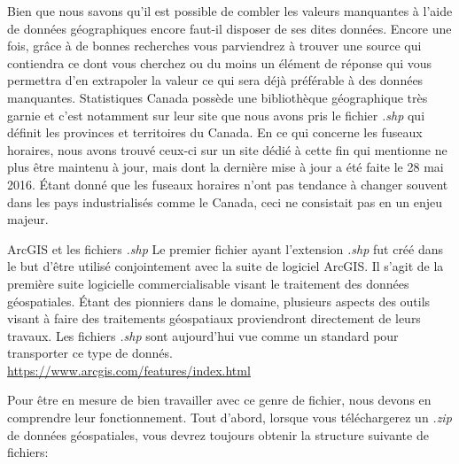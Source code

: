 \noindent
Bien que nous savons qu'il est possible de combler les valeurs manquantes à l'aide de données géographiques encore faut-il disposer de ses dites données. Encore une fois, grâce à de bonnes recherches vous parviendrez à trouver une source qui contiendra ce dont vous cherchez ou du moins un élément de réponse qui vous permettra d'en extrapoler la valeur ce qui sera déjà préférable à des données manquantes. Statistiques Canada possède une bibliothèque géographique très garnie et c'est notamment sur leur site que nous avons pris le fichier \emph{.shp} qui définit les provinces et territoires du Canada. \cite{Data:BoundaryFiles} En ce qui concerne les fuseaux horaires, nous avons trouvé ceux-ci sur un site dédié à cette fin qui mentionne ne plus être maintenu à jour, mais dont la dernière mise à jour a été faite le 28 mai 2016. Étant donné que les fuseaux horaires n'ont pas tendance à changer souvent dans les pays industrialisés comme le Canada, ceci ne consistait pas en un enjeu majeur. \cite{Data:tzWorlwide} \\

\begin{moreInfo}{ArcGIS et les fichiers \emph{.shp}}
	Le premier fichier ayant l'extension \emph{.shp} fut créé dans le but d'être utilisé conjointement avec la suite de logiciel ArcGIS. Il s'agit de la première suite logicielle commercialisable visant le traitement des données géospatiales. Étant des pionniers dans le domaine, plusieurs aspects des outils visant à faire des traitements géospatiaux proviendront directement de leurs travaux. Les fichiers \emph{.shp} sont aujourd'hui vue comme un standard pour transporter ce type de donnés. \\
\url{https://www.arcgis.com/features/index.html}
\end{moreInfo}

\noindent
Pour être en mesure de bien travailler avec ce genre de fichier, nous devons en comprendre leur fonctionnement. Tout d'abord, lorsque vous téléchargerez un \emph{.zip} de données géospatiales, vous devrez toujours obtenir la structure suivante de fichiers: \\


